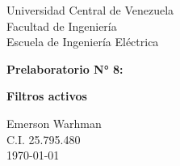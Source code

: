 \begin{titlepage}
    \centering
    \Large
    Universidad Central de Venezuela\\
    Facultad de Ingeniería\\
    Escuela de Ingeniería Eléctrica
    \vspace*{8cm}

    \Huge
    \textbf{Prelaboratorio N° 8: } 

    \textbf{Filtros activos}
    \vfill


    \Large

    Emerson Warhman \\
    C.I. 25.795.480 \\
    \today

\end{titlepage}